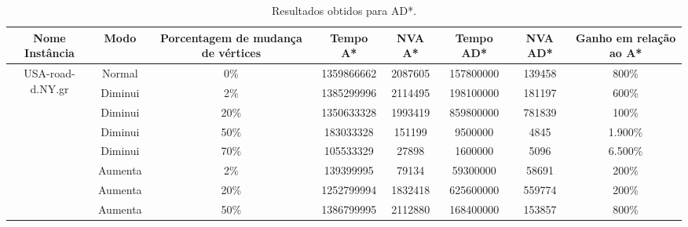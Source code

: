 \begin{table}[H]
\caption{Resultados obtidos para AD*.}
\label{tbl-experimentos-dinamicos-ad}
\centering
\begin{adjustbox}{max width=\textwidth}
\begin{tabular}{|c|c|c|c|c|c|c|c|}
\hline
\textbf{Nome Instância}            & \textbf{Modo} & \textbf{Porcentagem de mudança de vértices} & \textbf{Tempo A*} & \textbf{NVA A*} & \textbf{Tempo AD*} & \textbf{NVA AD*} & \textbf{Ganho em relação ao A*} \\ \hline
\multirow{9}{*}{USA-road-d.NY.gr}  & Normal        & 0\%                                         & 1359866662        & 2087605         & 157800000          & 139458           & 800\%                           \\ \cline{2-8} 
                                   & Diminui       & 2\%                                         & 1385299996        & 2114495         & 198100000          & 181197           & 600\%                           \\ \cline{2-8} 
                                   & Diminui       & 20\%                                        & 1350633328        & 1993419         & 859800000          & 781839           & 100\%                           \\ \cline{2-8} 
                                   & Diminui       & 50\%                                        & 183033328         & 151199          & 9500000            & 4845             & 1.900\%                         \\ \cline{2-8} 
                                   & Diminui       & 70\%                                        & 105533329         & 27898           & 1600000            & 5096             & 6.500\%                         \\ \cline{2-8} 
                                   & Aumenta       & 2\%                                         & 139399995         & 79134           & 59300000           & 58691            & 200\%                           \\ \cline{2-8} 
                                   & Aumenta       & 20\%                                        & 1252799994        & 1832418         & 625600000          & 559774           & 200\%                           \\ \cline{2-8} 
                                   & Aumenta       & 50\%                                        & 1386799995        & 2112880         & 168400000          & 153857           & 800\%                           \\ \cline{2-8} 

\end{tabular}
\end{adjustbox}
\end{table}
